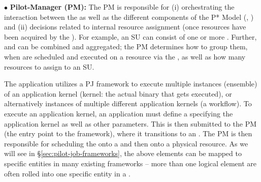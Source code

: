 \documentclass[conference]{IEEEtran}
\begin{document}
\noindent$\bullet$ \textbf{Pilot-Manager (PM):} The PM is responsible for (i)
  orchestrating the interaction between the \pilots as well as the
  different components of the P* Model (\cus, \sus) and (ii) decisions
  related to internal resource assignment (once resources have been
  acquired by the \pilotjob).  For example, an SU can consist of one
  or more \cus. Further, \cus and \sus can be combined and aggregated;
  the PM determines how to group them, when \sus are scheduled and
  executed on a resource via the \pilot, as well as how many resources
  to assign to an SU.







  
  The application utilizes a PJ framework to execute multiple
  instances (ensemble) of an application kernel (kernel: 
  the actual binary that gets executed), or
  alternatively instances of multiple different application kernels (a
  workflow).  To execute an application kernel, an application must
  define a \cu specifying the application kernel as well as other
  parameters. This \cu is then submitted to the PM (the entry point to
  the \pilotjob framework), where it transitions to an \su. The PM is
  then responsible for scheduling the \su onto a \pilot and then onto
  a physical resource.  As we will see in
  \S\ref{sec:pilot-job-frameworks}, the above elements can be mapped
  to specific entities in many existing \pilotjob frameworks --
  more than one logical element are often rolled into
  one specific entity in a \pilotjob.

% 
% 
\end{document}
